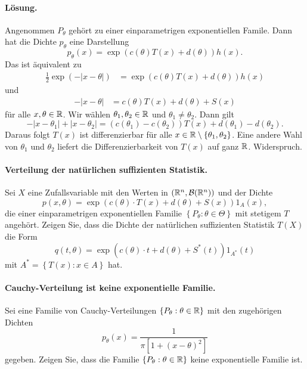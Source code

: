 \paragraph*{Lösung.}
Angenommen $P_\theta$ gehört zu einer einparametrigen exponentiellen Famile.
Dann hat die Dichte $p_\theta$ eine Darstellung
\begin{equation*}
	p_\theta(x) = \exp\left( c(\theta) T(x) + d(\theta) \right)h(x).
\end{equation*}
Das ist äquivalent zu
\begin{align*}
	\frac{1}{2} \exp \left( -| x - \theta | \right) &= 
		\exp\left( c(\theta) T(x) + d(\theta) \right)h(x)
\end{align*}
und
\begin{align*}
    -|x-\theta| &= c(\theta) T(x) + d(\theta) + S(x)
\end{align*}
für alle $x,\theta\in\mathbb R$. Wir wählen $\theta_1, \theta_2\in\mathbb R$ und 
$\theta_1 \neq \theta_2$. Dann gilt
\begin{equation*}
	- |x-\theta_1| + |x-\theta_2| = 
	\left( c(\theta_1)-c(\theta_2) \right)T(x) + d(\theta_1)-d(\theta_2).
\end{equation*}
Daraus folgt $T(x)$ ist differenzierbar für alle $x\in\mathbb R\setminus \left\{
\theta_1,\theta_2 \right\}$. Eine andere Wahl von $\theta_1$ und $\theta_2$
liefert die Differenzierbarkeit von $T(x)$ auf ganz $\mathbb R$. Widerspruch.  



\paragraph{Verteilung der natürlichen suffizienten Statistik. }
Sei $X$ eine Zufallsvariable mit den Werten in $\left( \mathbb R^n, \mathcal B(\mathbb R^n)\right)$ und der Dichte
\begin{equation*}
	p(x,\theta) = \exp\left( c(\theta)\cdot T(x) + d(\theta) + S(x) \right) 1_{A}(x),
\end{equation*}
die einer einparametrigen exponentiellen Familie $\left\{ P_\theta :
\theta\in\Theta \right\}$ mit stetigem $T$ angehört. Zeigen Sie, dass die Dichte der natürlichen
suffizienten Statistik $T(X)$ die Form
\begin{equation*}
	q(t, \theta) = \exp\left( c(\theta)\cdot t + d(\theta) + S^*(t) \right) 1_{A^*}(t)
\end{equation*}
mit $A^* = \left\{ T(x) : x\in A \right\}$ hat.


\paragraph{Cauchy-Verteilung ist keine exponentielle Familie.}  Sei eine
Familie von Cauchy-Verteilungen $\left\{ P_\theta : \theta\in\mathbb R \right\}$ mit 
den zugehörigen Dichten
\begin{equation*}
    p_\theta(x) = \frac{1}{\pi\left[ 1 + \left( x - \theta \right)^2 \right]}
\end{equation*}
gegeben. Zeigen Sie, dass die Familie $\left\{ P_\theta : \theta\in\mathbb R \right\}$ keine 
exponentielle Familie ist.

